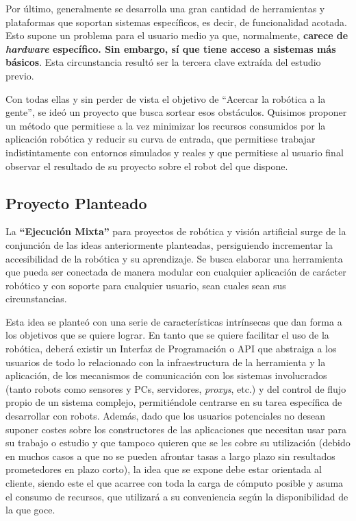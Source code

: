 Por último, generalmente se desarrolla una gran cantidad de herramientas y plataformas que soportan sistemas específicos, es decir, de funcionalidad acotada. Esto supone un problema para el usuario medio ya que, normalmente, \textbf{carece de \textit{hardware} específico. Sin embargo, sí que tiene acceso a sistemas más básicos}. Esta circunstancia resultó ser la tercera clave extraída del estudio previo.

Con todas ellas y sin perder de vista el objetivo de ``Acercar la robótica a la gente'', se ideó un proyecto que busca sortear esos obstáculos. Quisimos proponer un método que permitiese a la vez minimizar los recursos consumidos por la aplicación robótica y reducir su curva de entrada, que permitiese trabajar indistintamente con entornos simulados y reales y que permitiese al usuario final observar el resultado de su proyecto sobre el robot del que dispone.

\subsection{Proyecto Planteado}

La \textbf{``Ejecución Mixta''} para proyectos de robótica y visión artificial surge de la conjunción de las ideas anteriormente planteadas, persiguiendo incrementar la accesibilidad de la robótica y su aprendizaje. Se busca elaborar una herramienta que pueda ser conectada de manera modular con cualquier aplicación de carácter robótico y con soporte para cualquier usuario, sean cuales sean sus circunstancias.

Esta idea se planteó con una serie de características intrínsecas que dan forma a los objetivos que se quiere lograr. En tanto que se quiere facilitar el uso de la robótica, deberá existir un Interfaz de Programación o API que abstraiga a los usuarios de todo lo relacionado con la infraestructura de la herramienta y la aplicación, de los mecanismos de comunicación con los sistemas involucrados (tanto robots como sensores y PCs, servidores, \textit{proxys}, etc.) y del control de flujo propio de un sistema complejo, permitiéndole centrarse en su tarea específica de desarrollar con robots. Además, dado que los usuarios potenciales no desean suponer costes sobre los constructores de las aplicaciones que necesitan usar para su trabajo o estudio y que tampoco quieren que se les cobre su utilización (debido en muchos casos a que no se pueden afrontar tasas a largo plazo sin resultados prometedores en plazo corto), la idea que se expone debe estar orientada al cliente, siendo este el que acarree con toda la carga de cómputo posible y asuma el consumo de recursos, que utilizará a su conveniencia según la disponibilidad de la que goce.

